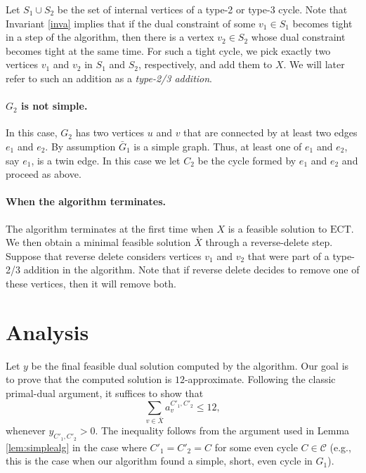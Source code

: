 \documentclass{article}
\newcommand{\ect}{\ensuremath{\mbox{ECT}}}
\newcommand{\C}{\ensuremath{\mathcal{C}}}
\newcommand{\0}{\mathbb{0}}
\newcommand{\1}{\mathbb{1}}
\begin{document}
Let $S_1 \cup S_2$ be the set of internal vertices of a type-2 or type-3 cycle. Note that
Invariant \ref{inva} implies that if the dual constraint of some $v_1 \in S_1$ becomes
tight in a step of the algorithm, then there is a vertex $v_2 \in S_2$ whose dual
constraint becomes tight at the same time. For such a tight cycle, we pick exactly two
vertices
$v_1$ and $v_2$ in $S_1$ and $S_2$, respectively, and add them to $X$. We will later refer
to such an addition as a {\em type-2/3 addition}.

\paragraph{$G_2$ is not simple.}

In this case, $G_2$ has two vertices $u$ and $v$ that are connected by at least two edges
$e_1$ and $e_2$. By assumption $\bar{G}_1$ is a simple graph. Thus, at least one of $e_1$
and $e_2$, say $e_1$, is a twin edge. In this case we let $C_2$ be the cycle formed by
$e_1$ and $e_2$ and proceed as above.

\paragraph{When the algorithm terminates.}

The algorithm terminates at the first time when $X$ is a feasible solution to \ect. We
then obtain a minimal feasible solution $\bar{X}$ through a reverse-delete step. 
Suppose that reverse delete considers vertices $v_1$ and $v_2$ that were part of a
type-2/3 addition in the algorithm. Note that if reverse delete decides to remove one of
these vertices, then it will remove both. 

\section{Analysis}

Let $y$ be the final feasible dual solution computed by the algorithm. 
Our goal is to prove that the computed solution is $12$-approximate. 
Following the classic primal-dual argument, it
suffices to show that
\begin{equation}\label{eq:pd}
\sum_{v \in \bar{X}} a^{C'_1,C'_2}_v \leq 12,
\end{equation}
whenever $y_{C'_1,C'_2}>0$. The inequality follows from the argument used in Lemma 
\ref{lem:simplealg} in the case where $C'_1=C'_2=C$ for some even cycle $C \in \C$
(e.g., this is the
case when our algorithm found a simple, short, even cycle in $G_1$).
\end{document}
